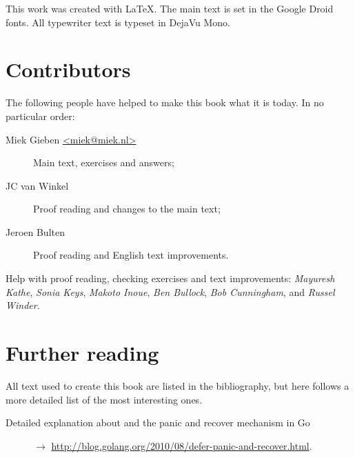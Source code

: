\noindent{}This work was created with \LaTeX. The main text is set in
the Google Droid fonts. All typewriter text is typeset in DejaVu Mono.

\section{Contributors}
The following people have helped to make this book what it is today.
In no particular order:
\begin{description}
\item[Miek Gieben \qquad\url{<miek@miek.nl>}] 
{Main text, exercises and answers;}
\item[JC van Winkel]
{Proof reading and changes to the main text;}
\item[Jeroen Bulten]
{Proof reading and English text improvements.}
\end{description}

Help with proof reading, checking exercises and text improvements:
\emph{Mayuresh Kathe},
\emph{Sonia Keys},
\emph{Makoto Inoue},
\emph{Ben Bullock},
\emph{Bob Cunningham},
and \emph{Russel Winder}.

\section{Further reading}
All text used to create this book are listed in the bibliography, but
here follows a more detailed list of the most interesting ones.
\begin{description}
\item[Detailed explanation about  and the panic and recover
mechanism in Go]{$\rightarrow$
\url{http://blog.golang.org/2010/08/defer-panic-and-recover.html}.}
\end{description}
